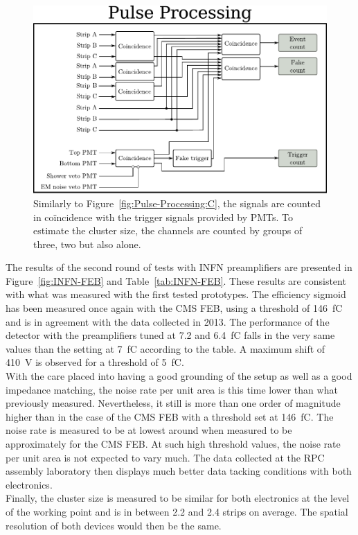 	\begin{figure}[H]
		\centering
		\includegraphics[width=.8\linewidth]{fig/chapt6/pulse-processing-2014.pdf}
		\caption{\label{fig:Pulse-Processing-904} Similarly to Figure~\ref{fig:Pulse-Processing:C}, the signals are counted in coïncidence with the trigger signals provided by PMTs. To estimate the cluster size, the channels are counted by groups of three, two but also alone.}
	\end{figure}
	
	The results of the second round of tests with INFN preamplifiers are presented in Figure~\ref{fig:INFN-FEB} and Table~\ref{tab:INFN-FEB}. These results are consistent with what was measured with the first tested prototypes. The efficiency sigmoid has been measured once again with the CMS FEB, using a threshold of \SI{146}{fC} and is in agreement with the data collected in 2013. The performance of the detector with the preamplifiers tuned at 7.2 and \SI{6.4}{fC} falls in the very same values than the setting at \SI{7}{fC} according to the table. A maximum shift of \SI{410}{V} is observed for a threshold of \SI{5}{fC}.\\
	With the care placed into having a good grounding of the setup as well as a good impedance matching, the noise rate per unit area is this time lower than what previously measured. Nevertheless, it still is more than one order of magnitude higher than in the case of the CMS FEB with a threshold set at \SI{146}{fC}. The noise rate is measured to be at lowest around  when measured to be approximately  for the CMS FEB. At such high threshold values, the noise rate per unit area is not expected to vary much. The data collected at the RPC assembly laboratory then displays much better data tacking conditions with both electronics.\\
	Finally, the cluster size is measured to be similar for both electronics at the level of the working point and is in between 2.2 and 2.4 strips on average. The spatial resolution of both devices would then be the same.
	
